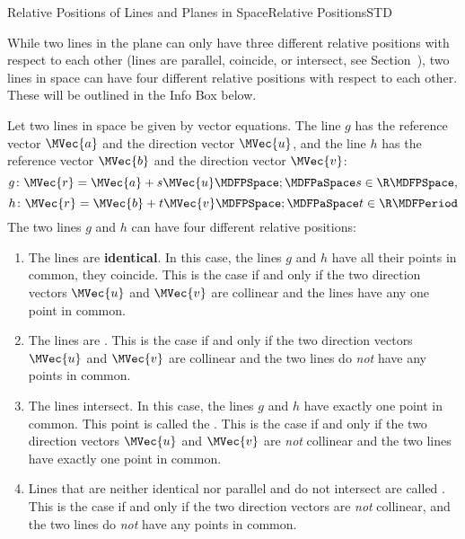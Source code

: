 \begin{MXContent}{Relative Positions of Lines and Planes in Space}{Relative Positions}{STD}

While two lines in the plane can only have three different relative positions with respect to each other 
(lines are parallel, coincide, or intersect, see Section~), 
two lines in space can have four different relative positions with respect to each other. These will be 
outlined in the Info Box below.

\begin{MInfo}

Let two lines in space be given by vector equations. The line $g$ has the reference vector 
$\MVec{a}$ and the direction vector $\MVec{u}$, and the line $h$ has the reference vector $\MVec{b}$
and the direction vector $\MVec{v}$:
\[
 g\colon\MVec{r}=\MVec{a}+s\MVec{u}\MDFPSpace;\MDFPaSpace s\in\R \MDFPSpace,
\]
\[
 h\colon\MVec{r}=\MVec{b}+t\MVec{v}\MDFPSpace;\MDFPaSpace t\in\R\MDFPeriod
\]
The two lines $g$ and $h$ can have four different relative positions:
\begin{enumerate}
 \item The lines are \textbf{identical}. In this case, the lines $g$ and $h$ have all their points in common, 
  they coincide. This is the case if and only if the two direction vectors $\MVec{u}$ and 
  $\MVec{v}$ are collinear and the lines have any one point in common.
 \item The lines are . This is the case if and only if 
  the two direction vectors $\MVec{u}$ and $\MVec{v}$ are collinear and the two lines do \textit{not} have any 
  points in common.
 \item The lines intersect. In this case, the lines $g$ and $h$ have exactly one point in common. 
  This point is called the . 
  This is the case if and only if the two direction vectors $\MVec{u}$ and $\MVec{v}$ are 
  \textit{not} collinear and the two lines have exactly one point in common.
 \item Lines that are neither identical nor parallel and do not intersect are called 
  . This is the case if and only if the two direction vectors are \textit{not} 
  collinear, and the two lines do \textit{not} have any points in common.
\end{enumerate}


\end{MInfo}
\end{MXContent}
